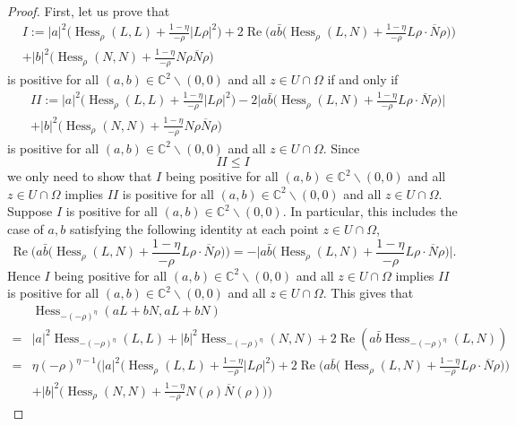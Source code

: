 \documentclass[11pt]{article}
\theoremstyle{plain} \numberwithin{equation}{section}
\theoremstyle{definition}
\DeclareMathOperator{\Hessian}{Hess}
\renewcommand{\Re}{\operatorname{Re}}
\begin{document}
\begin{proof}
	First, let us prove that \[\begin{split}
	&I:=|a|^2\Big(\Hessian_\rho (L, L)+\frac{1-\eta}{-\rho}|L\rho|^2\Big)+2\Re \Big(a\bar{b}\Big(\Hessian_\rho (L, N)+\frac{1-\eta}{-\rho}L\rho\cdot\overline{N}\rho\Big)\Big)\\&+|b|^2 \Big(\Hessian_\rho (N, N)+\frac{1-\eta}{-\rho}N\rho\overline{N} \rho\Big)
	\end{split}\] is positive for all $(a,b)\in\mathbb{C}^2\backslash(0,0)$ and all $z\in U\cap\Omega$ if and only if \[\begin{split}
	&I\!I:=|a|^2\Big(\Hessian_\rho (L, L)+\frac{1-\eta}{-\rho}|L\rho|^2\Big)-2\Big|a\bar{b}\Big(\Hessian_\rho (L, N)+\frac{1-\eta}{-\rho}L\rho\cdot\overline{N}\rho\Big)\Big|\\&+|b|^2 \Big(\Hessian_\rho (N, N)+\frac{1-\eta}{-\rho}N\rho\overline{N} \rho\Big)
	\end{split}\] is positive for all $(a,b)\in\mathbb{C}^2\backslash(0,0)$ and all $z\in U\cap\Omega$. Since \[I\!I\leq I\]  we only need to show that $I$ being positive for all $(a,b)\in\mathbb{C}^2\backslash(0,0)$ and all $z\in U\cap\Omega$ implies $I\!I$ is positive for all $(a,b)\in\mathbb{C}^2\backslash(0,0)$ and all $z\in U\cap\Omega$. Suppose $I$ is positive for all $(a,b)\in\mathbb{C}^2\backslash(0,0)$. In particular, this includes the case of $a, b$ satisfying the following identity at each point $z\in U\cap\Omega$, \[\Re \Big(a\bar{b}\Big(\Hessian_\rho (L, N)+\frac{1-\eta}{-\rho}L\rho\cdot\overline{N}\rho\Big)\Big)=-\Big|a\bar{b}\Big(\Hessian_\rho (L, N)+\frac{1-\eta}{-\rho}L\rho\cdot\overline{N}\rho\Big)\Big|.\] Hence $I$ being positive for all $(a,b)\in\mathbb{C}^2\backslash(0,0)$ and all $z\in U\cap\Omega$ implies $I\!I$ is positive for all $(a,b)\in\mathbb{C}^2\backslash(0,0)$ and all $z\in U\cap\Omega$. This gives that 	\[\begin{split}
	&\Hessian_{-(-\rho)^\eta }(aL+bN,aL+bN)\\=&|a|^2\Hessian_{-(-\rho)^\eta}(L, L)+|b|^2\Hessian_{-(-\rho)^\eta }(N, N)+2\Re (a\bar{b}\Hessian_{-(-\rho)^\eta }(L, N))\\=&\eta (-\rho)^{\eta-1}\Bigg(|a|^2\Big(\Hessian_\rho (L, L)+\frac{1-\eta}{-\rho}|L\rho|^2\Big)+2\Re \Big(a\bar{b}\Big(\Hessian_\rho (L, N)+\frac{1-\eta}{-\rho}L\rho\cdot\overline{N}\rho\Big)\Big)\\&+|b|^2 \Big(\Hessian_\rho (N, N)+\frac{1-\eta}{-\rho}N(\rho)\overline{N} (\rho)\Big)\Bigg)
	\end{split}\]

\end{proof}
\end{document}

